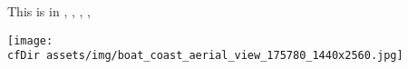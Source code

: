 This is in \textbf{\currfilename},
\textbf{\currfiledir},
\textbf{\currfilepath},
\textbf{\currfileabsdir},
\textbf{\currfileabspath}
\par

\texttt{[image: \\cfDir assets/img/boat\_coast\_aerial\_view\_175780\_1440x2560.jpg]}
\par

